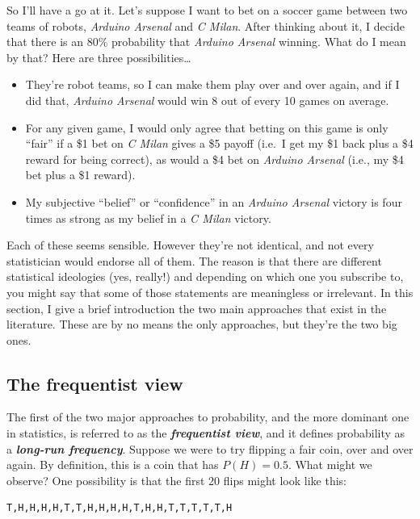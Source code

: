 \documentclass[
]{book}
\providecommand{\tightlist}{%
  \setlength{\itemsep}{0pt}\setlength{\parskip}{0pt}}
\begin{document}
So I'll have a go at it. Let's suppose I want to bet on a soccer game between two teams of robots, \emph{Arduino Arsenal} and \emph{C Milan}. After thinking about it, I decide that there is an 80\% probability that \emph{Arduino Arsenal} winning. What do I mean by that? Here are three possibilities\ldots{}

\begin{itemize}
\tightlist
\item
  They're robot teams, so I can make them play over and over again, and if I did that, \emph{Arduino Arsenal} would win 8 out of every 10 games on average.
\item
  For any given game, I would only agree that betting on this game is only ``fair'' if a \$1 bet on \emph{C Milan} gives a \$5 payoff (i.e.~I get my \$1 back plus a \$4 reward for being correct), as would a \$4 bet on \emph{Arduino Arsenal} (i.e., my \$4 bet plus a \$1 reward).
\item
  My subjective ``belief'' or ``confidence'' in an \emph{Arduino Arsenal} victory is four times as strong as my belief in a \emph{C Milan} victory.
\end{itemize}

Each of these seems sensible. However they're not identical, and not every statistician would endorse all of them. The reason is that there are different statistical ideologies (yes, really!) and depending on which one you subscribe to, you might say that some of those statements are meaningless or irrelevant. In this section, I give a brief introduction the two main approaches that exist in the literature. These are by no means the only approaches, but they're the two big ones.

\hypertarget{the-frequentist-view}{%
\subsection{The frequentist view}\label{the-frequentist-view}}

The first of the two major approaches to probability, and the more dominant one in statistics, is referred to as the \textbf{\emph{frequentist view}}, and it defines probability as a \textbf{\emph{long-run frequency}}. Suppose we were to try flipping a fair coin, over and over again. By definition, this is a coin that has \(P(H) = 0.5\). What might we observe? One possibility is that the first 20 flips might look like this:

\begin{verbatim}
T,H,H,H,H,T,T,H,H,H,H,T,H,H,T,T,T,T,T,H
\end{verbatim}
\end{document}

